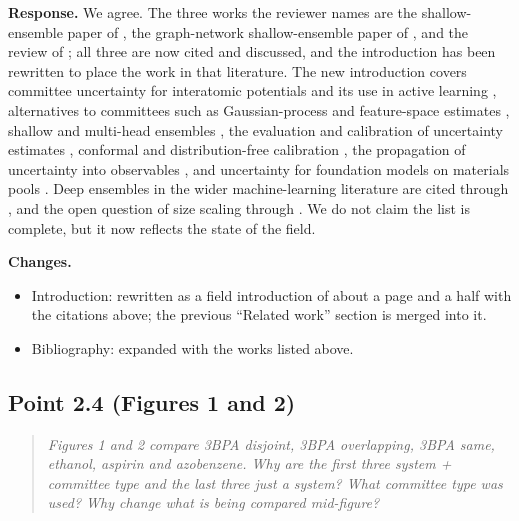 \documentclass[11pt]{article}
\newcommand{\rpoint}[1]{\begin{quote}\itshape #1\end{quote}}
\newcommand{\response}{\medskip\noindent\textbf{Response.} }
\newcommand{\changes}{\medskip\noindent\textbf{Changes.}}
\begin{document}
\response
We agree. The three works the reviewer names are the shallow-ensemble paper of
\citet{kellner2024shallow}, the graph-network shallow-ensemble paper of
\citet{vinchurkar2025gnn}, and the review of \citet{dai2025review}; all three
are now cited and discussed, and the introduction has been rewritten to place
the work in that literature. The new introduction covers committee
uncertainty for interatomic potentials and its use in active learning
\citep{artrith2012high,gastegger2017machine,smith2018less,zhang2019active,schran2020committee,imbalzano2021uncertainty,zaverkin2021exploration,kulichenko2023uncertainty,chepkasov2026active},
alternatives to committees such as Gaussian-process and feature-space
estimates
\citep{podryabinkin2017active,janet2019quantitative,musil2019fast,vandermause2020flare,zhu2023fast},
shallow and multi-head ensembles
\citep{kellner2024shallow,vinchurkar2025gnn,schafer2026shallow,beck2025committee},
the evaluation and calibration of uncertainty estimates
\citep{tran2020methods,busk2021calibrated,kahle2022quality,pernot2022long,levi2022evaluating,tan2023single,heid2024spatially,dai2025review},
conformal and distribution-free calibration
\citep{vovk2005algorithmic,lei2018distribution,hu2022conformal}, the
propagation of uncertainty into observables
\citep{kellner2024shallow,bigi2024rigidity,schwalbekoda2025information}, and
uncertainty for foundation models on materials pools
\citep{deng2023chgnet,batatia2023foundation,barrosoluque2024omat24,riebesell2025matbench,bilbrey2025foundation}.
Deep ensembles in the wider machine-learning literature are cited through
\citet{lakshminarayanan2017simple}, and the open question of size scaling
through \citet{lortaraprasert2026size}. We do not claim the list is complete,
but it now reflects the state of the field.

\changes
\begin{itemize}
\item Introduction: rewritten as a field introduction of about a page and a
  half with the citations above; the previous ``Related work'' section is
  merged into it.
\item Bibliography: expanded with the works listed above.
\end{itemize}

\subsection*{Point 2.4 (Figures 1 and 2)}
\rpoint{Figures 1 and 2 compare 3BPA disjoint, 3BPA overlapping, 3BPA same,
ethanol, aspirin and azobenzene. Why are the first three system + committee
type and the last three just a system? What committee type was used? Why
change what is being compared mid-figure?}
\end{document}
